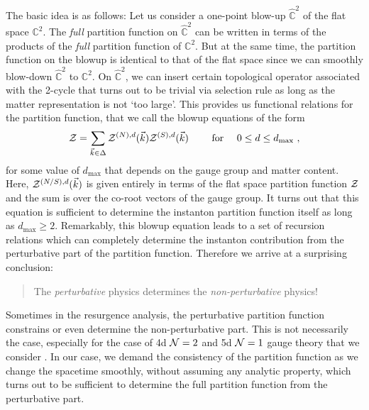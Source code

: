 \documentclass[letterpaper, 11pt]{article}
\def\IC{\mathbb{C}}
\def\CN{{\cal N}}
\def\CZ{{\cal Z}}
\begin{document}
The basic idea is as follows: Let us consider a one-point blow-up $\hat{\IC}^2$ of the flat space $\IC^2$. The \emph{full} partition function on $\hat{\IC}^2$ can be written in terms of the products of the \emph{full} partition function of $\IC^2$. But at the same time, the partition function on the blowup is identical to that of the flat space since we can smoothly blow-down $\hat{\IC}^2$ to $\IC^2$. On $\hat{\IC}^2$, we can insert certain topological operator associated with the 2-cycle that turns out to be trivial via selection rule as long as the matter representation is not `too large'. This provides us functional relations for the partition function, that we call the blowup equations of the form
\begin{align}
 \CZ = \sum_{\vec{k} \in \Delta} \CZ^{(N), d}(\vec{k}) \CZ^{(S), d}(\vec{k}) \qquad \textrm{ for }\quad 0 \le d \le d_{\text{max}} \ , 
\end{align}
for some value of $d_\text{max}$ that depends on the gauge group and matter content. Here, $\CZ^{(N/S), d} (\vec{k})$ is given entirely in terms of the flat space partition function $\CZ$ and the sum is over the co-root vectors of the gauge group. 
It turns out that this equation is sufficient to determine the instanton partition function itself as long as $d_\text{max} \ge 2$. Remarkably, this blowup equation leads to a set of recursion relations which can completely determine the instanton contribution from the perturbative part of the partition function. Therefore we arrive at a surprising conclusion: 
\begin{quote}
\centering
The \emph{perturbative} physics determines the \emph{non-perturbative} physics! 	
\end{quote}
Sometimes in the resurgence analysis, the perturbative partition function constrains or even determine the non-perturbative part. This is not necessarily the case, especially for the case of 4d $\CN=2$ and 5d $\CN=1$ gauge theory that we consider \cite{Honda:2016mvg}. In our case, we demand the consistency of the partition function as we change the spacetime smoothly, without assuming any analytic property, which turns out to be sufficient to determine the full partition function from the perturbative part. 
\end{document}
